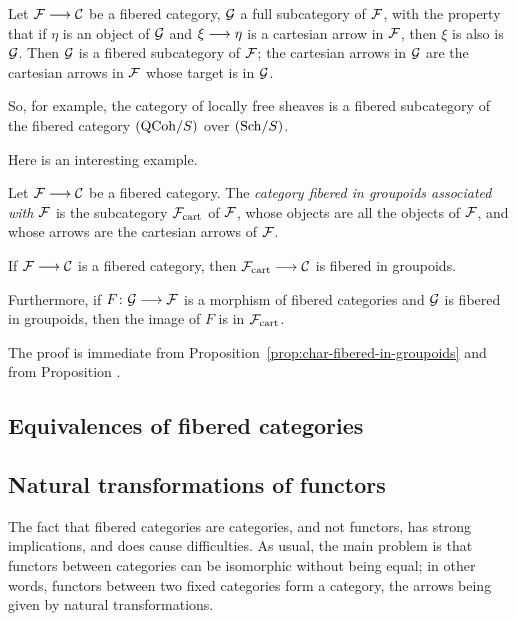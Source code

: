 \begin{3   FIBERED CATEGORIES}
\begin{3.4 Functors and cats fibered in sets}
\begin{example}
Let $\cF \arr \cC$ be a fibered category, $\mathcal{G}$ a full subcategory of $\mathcal{F}$, with the property that if $\eta$ is an object of $\mathcal{G}$ and $\xi \arr \eta$ is a cartesian arrow in $\mathcal{F}$, then $\xi$ is also is $\mathcal{G}$. Then $\mathcal{G}$ is a fibered subcategory of $\mathcal{F}$; the cartesian arrows in $\mathcal{G}$ are the cartesian arrows in $\mathcal{F}$ whose target is in $\mathcal{G}$.
\end{example}

So, for example, the category of locally free sheaves is a fibered subcategory of the fibered category $({\mathrm{QCoh}/S})$ over $({\mathrm{Sch}/S})$. 

Here is an interesting example.

\begin{definition}\label{def:ass-groupoids}
Let $\cF \arr \cC$ be a fibered category. The \emph{category fibered in groupoids associated with $\mathcal{F}$}\index{$\cF\cart$} is the subcategory $\cF\cart$ of $\mathcal{F}$, whose objects are all the objects of $\mathcal{F}$, and whose arrows are the cartesian arrows of $\mathcal{F}$.
\end{definition}

\begin{proposition}
If $\cF \arr \cC$ is a fibered category, then $\cF\cart \arr \cC$ is fibered in groupoids.

Furthermore, if $F\colon \cG \arr \cF$ is a morphism of fibered categories and $\mathcal{G}$ is fibered in groupoids, then the image of $F$ is in $\cF\cart$.
\end{proposition}

The proof is immediate from Proposition~\ref{prop:char-fibered-in-groupoids} and from Proposition .


\end{3.4 Functors and cats fibered in sets}
\begin{3.5 Equivalences of fibered categories}
\setcounter{section}{4}
\section{Equivalences of fibered categories}

\subsection{Natural transformations of functors}

The fact that fibered categories are categories, and not functors, has strong implications, and does cause difficulties. As usual, the main problem is that functors between categories can be isomorphic without being equal; in other words, functors between two fixed categories form a category, the arrows being given by natural transformations.


\end{3.5 Equivalences of fibered categories}
\end{3   FIBERED CATEGORIES}
